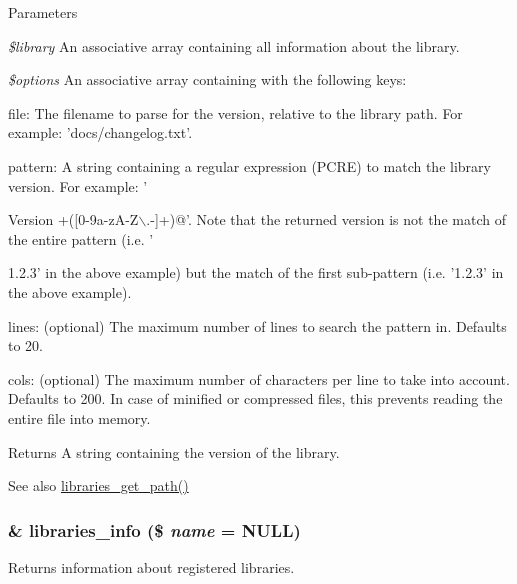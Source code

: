\begin{DoxyParams}{Parameters}
\item[{\em \$library}]An associative array containing all information about the library. \item[{\em \$options}]An associative array containing with the following keys:
\begin{DoxyItemize}
\item file: The filename to parse for the version, relative to the library path. For example: 'docs/changelog.txt'.
\item pattern: A string containing a regular expression (PCRE) to match the library version. For example: '
\end{DoxyItemize}\end{DoxyParams}
\begin{DoxyVersion}{Version}
+(\mbox{[}0-\/9a-\/zA-\/Z$\backslash$.-\/\mbox{]}+)@'. Note that the returned version is not the match of the entire pattern (i.e. '

1.2.3' in the above example) but the match of the first sub-\/pattern (i.e. '1.2.3' in the above example).
\begin{DoxyItemize}
\item lines: (optional) The maximum number of lines to search the pattern in. Defaults to 20.
\item cols: (optional) The maximum number of characters per line to take into account. Defaults to 200. In case of minified or compressed files, this prevents reading the entire file into memory.
\end{DoxyItemize}
\end{DoxyVersion}
\begin{DoxyReturn}{Returns}
A string containing the version of the library.
\end{DoxyReturn}
\begin{DoxySeeAlso}{See also}
\hyperlink{libraries_8module_af6582ffdd6b230b9532c8fd007448b2e}{libraries\_\-get\_\-path()} 
\end{DoxySeeAlso}
\hypertarget{libraries_8module_ae592b03bbea251cc7c008cd5ed10c861}{
\subsubsection[{libraries\_\-info}]{\setlength{\rightskip}{0pt plus 5cm}\& libraries\_\-info (\$ {\em name} = {\ttfamily NULL})}}
\label{libraries_8module_ae592b03bbea251cc7c008cd5ed10c861}
Returns information about registered libraries.

